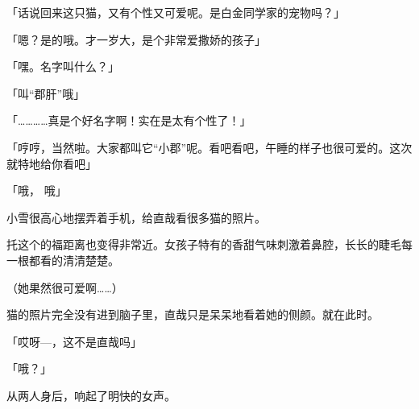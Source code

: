 「话说回来这只猫，又有个性又可爱呢。是白金同学家的宠物吗？」

「嗯？是的哦。才一岁大，是个非常爱撒娇的孩子」

「嘿。名字叫什么？」

「叫“郡肝”哦」

「…………真是个好名字啊！实在是太有个性了！」

「哼哼，当然啦。大家都叫它“小郡”呢。看吧看吧，午睡的样子也很可爱的。这次就特地给你看吧」

「哦， 哦」

小雪很高心地摆弄着手机，给直哉看很多猫的照片。

托这个的福距离也变得非常近。女孩子特有的香甜气味刺激着鼻腔，长长的睫毛每一根都看的清清楚楚。

（她果然很可爱啊……）

猫的照片完全没有进到脑子里，直哉只是呆呆地看着她的侧颜。就在此时。

「哎呀—，这不是直哉吗」

「哦？」

从两人身后，响起了明快的女声。
